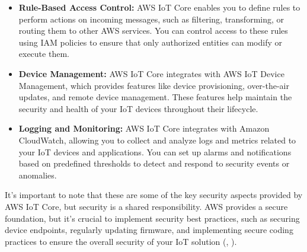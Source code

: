 \begin{itemize}
	\item \textbf{Rule-Based Access Control:} AWS IoT Core enables you to define rules to perform actions on incoming messages, such as filtering, transforming, or routing them to other AWS services. You can control access to these rules using IAM policies to ensure that only authorized entities can modify or execute them.
	
	\item \textbf{Device Management:} AWS IoT Core integrates with AWS IoT Device Management, which provides features like device provisioning, over-the-air updates, and remote device management. These features help maintain the security and health of your IoT devices throughout their lifecycle.
	
	\item \textbf{Logging and Monitoring:} AWS IoT Core integrates with Amazon CloudWatch, allowing you to collect and analyze logs and metrics related to your IoT devices and applications. You can set up alarms and notifications based on predefined thresholds to detect and respond to security events or anomalies.
\end{itemize}

It's important to note that these are some of the key security aspects provided by AWS IoT Core, but security is a shared responsibility. 
AWS provides a secure foundation, but it's crucial to implement security best practices, such as securing device endpoints, regularly updating firmware, and implementing secure coding practices to ensure the overall security of your IoT solution (\cite{RefAwsIotCoreSecurity}, \cite{RefAwsIotCoreSecurityBestPractices}).